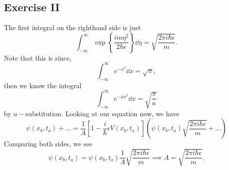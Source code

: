 \subsection{Exercise II}
The first integral on the righthand side is just 
\begin{equation}
    \int_{-\infty}^{\infty}\exp\left\{\frac{im\eta^2}{2\hbar\epsilon}\right\}\dd \eta = \sqrt{\frac{2\pi i \hbar \epsilon}{m}}.
\end{equation}
Note that this is since, 
\begin{equation}
    \int_{-\infty}^{\infty}e^{-x^2}\dd x = \sqrt{\pi},
\end{equation}
then we know the integral 
\begin{equation}
    \int_{-\infty}^{\infty}e^{-ax^2}\dd x = \sqrt{\frac{\pi}{a}}
\end{equation}
by $u-$substitution. Looking at our equation now, we have 
\begin{equation}
    \psi (x_b, t_a) + \dots = \frac{1}{A}[1 - \frac{i}{\hbar} \epsilon V(x_b, t_a)]\left(\psi (x_b, t_a) \sqrt{\frac{2\pi i \hbar \epsilon}{m}} + \dots \right)
\end{equation}
Comparing both sides, we see 
\begin{equation}
\psi (x_b, t_a) = \psi (x_b, t_a) \frac{1}{A}\sqrt{\frac{2\pi i \hbar \epsilon}{m}}\implies A = \sqrt{\frac{2\pi i \hbar \epsilon}{m}}.
\end{equation}
\newpage 